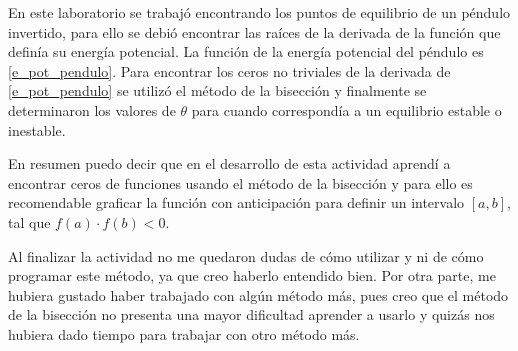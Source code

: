\documentclass[../portafolio.tex]{subfiles}
\begin{document}
En este laboratorio se trabajó encontrando los puntos de equilibrio de un péndulo invertido, para ello se debió encontrar las raíces de la derivada de la función que definía su energía potencial. La función de la energía potencial del péndulo es \ref{e_pot_pendulo}. Para encontrar los ceros no triviales de la derivada de \ref{e_pot_pendulo} se utilizó el método de la bisección y finalmente se determinaron los valores de $\theta$ para cuando correspondía a un equilibrio estable o inestable.

\vspace{2mm}
En resumen puedo decir que en el desarrollo de esta actividad aprendí a encontrar ceros de funciones usando el método de la bisección y para ello es recomendable graficar la función con anticipación para definir un intervalo $[a,b]$, tal que $f(a)\cdot f(b)<0$.

\vspace{2mm}
Al finalizar la actividad no me quedaron dudas de cómo utilizar y ni de cómo programar este método, ya que creo haberlo entendido bien. Por otra parte, me hubiera gustado haber trabajado con algún método más, pues creo que el método de la bisección no presenta una mayor dificultad aprender a usarlo y quizás nos hubiera dado tiempo para trabajar con otro método más.
\end{document}

